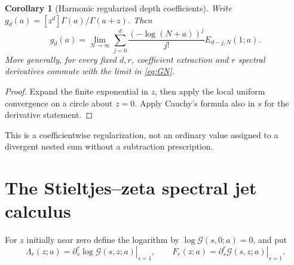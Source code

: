 \documentclass[11pt]{article}
\numberwithin{equation}{section}
\newtheorem{corollary}[theorem]{Corollary}
\theoremstyle{definition}\newtheorem{definition}[theorem]{Definition}
\theoremstyle{remark}\newtheorem{remark}[theorem]{Remark}
\newcommand{\G}{\mathcal G}\newcommand{\F}{\mathfrak F}
\begin{document}
\begin{corollary}[Harmonic regularized depth coefficients]
\label{cor:harmonicreg}
Write $g_d(a)=[z^d]\Gamma(a)/\Gamma(a+z)$. Then
\begin{equation}
 g_d(a)=\lim_{N\to\infty}
       \sum_{j=0}^d\frac{(-\log(N+a))^j}{j!}E_{d-j,N}(1;a).
 \label{eq:harmonicreg}
\end{equation}
More generally, for every fixed $d,r$, coefficient extraction and
$r$ spectral derivatives commute with the limit in \eqref{eq:GN}.
\end{corollary}
\begin{proof}
Expand the finite exponential in $z$, then apply the local uniform
convergence on a circle about $z=0$. Apply Cauchy's formula also in $s$
for the derivative statement.
\end{proof}
This is a coefficientwise regularization, not an ordinary value assigned to
a divergent nested sum without a subtraction prescription.

\section{The Stieltjes--zeta spectral jet calculus}
\label{sec:jets}
For $z$ initially near zero define the logarithm by $\log\G(s,0;a)=0$, and
put
\begin{equation}
 \Lambda_r(z;a)=\left.\partial_s^r\log\G(s,z;a)\right|_{s=1},
 \qquad F_r(z;a)=\left.\partial_s^r\G(s,z;a)\right|_{s=1}.
 \label{eq:Lambda}
\end{equation}
\end{document}
